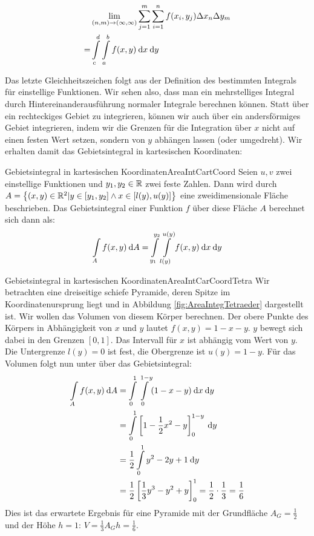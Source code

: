 \begin{center}
    \begin{alignat*}{1}
          & \lim\limits_{(n,m) \to (\infty, \infty)} \sum\limits_{j=1}^m \sum\limits_{i=1}^n f(x_i,y_j) \Delta x_n \Delta y_m  \\
        = & \int\limits_c^d \int\limits_a^b f(x,y) \:\mathrm{d}{x} \:\mathrm{d}{y}
    \end{alignat*}
\end{center}

Das letzte Gleichheitszeichen folgt aus der Definition des bestimmten Integrals für einstellige Funktionen. Wir sehen also, dass man ein mehrstelliges Integral durch Hintereinanderausführung normaler Integrale berechnen können. Statt über ein rechteckiges Gebiet zu integrieren, können wir auch über ein andersförmiges Gebiet integrieren, indem wir die Grenzen für die Integration über $x$ nicht auf einen festen Wert setzen, sondern von $y$ abhängen lassen (oder umgedreht). Wir erhalten damit das Gebietsintegral in kartesischen Koordinaten:

\begin{definition}{Gebietsintegral in kartesischen Koordinaten}{AreaIntCartCoord}
    Seien $u,v$ zwei einstellige Funktionen und $y_1,y_2\in\mathbb{R}$ zwei feste Zahlen. Dann wird durch $A = \left\lbrace (x,y) \in \mathbb{R}^2 | y \in [y_1,y_2] \land x \in [l(y), u(y)] \right\rbrace$ eine zweidimensionale Fläche beschrieben. Das Gebietsintegral einer Funktion $f$ über diese Fläche $A$ berechnet sich dann als:
    $$
        \int\limits_{A} f(x,y) \:\mathrm{d}{A} = \int\limits_{y_1}^{y_2} \int\limits_{l(y)}^{u(y)} f(x,y) \:\mathrm{d}{x} \:\mathrm{d}{y}
    $$
\end{definition}

\begin{example}{Gebietsintegral in kartesischen Koordinaten}{AreaIntCarCoordTetra}
    Wir betrachten eine dreiseitige schiefe Pyramide, deren Spitze im Koordinatenursprung liegt und in Abbildung \ref{fig:AreaIntegTetraeder} dargestellt ist. Wir wollen das Volumen von diesem Körper berechnen. Der obere Punkte des Körpers in Abhängigkeit von $x$ und $y$ lautet $f(x,y) = 1-x-y$. $y$ bewegt sich dabei in den Grenzen $[0,1]$. Das Intervall für $x$ ist abhängig vom Wert von $y$. Die Untergrenze $l(y) = 0$ ist fest, die Obergrenze ist $u(y) = 1 - y$. Für das Volumen folgt nun unter über das Gebietsintegral:
    \begin{alignat*}{1}
        \int\limits_{A} f(x,y) \:\mathrm{d}{A} & = \int\limits_{0}^{1} \int\limits_{0}^{1-y} (1-x-y) \:\mathrm{d}{x} \:\mathrm{d}{y} \\
                                        & = \int\limits_{0}^{1} \left[1-\frac{1}{2}x^2-y\right]_{0}^{1-y} \:\mathrm{d}{y} \\
                                        & = \frac{1}{2} \int\limits_{0}^{1} y^2-2y+1 \:\mathrm{d}{y} \\
                                        & = \frac{1}{2} \left[\frac{1}{3}y^3-y^2+y\right]_0^1 = \frac{1}{2} \cdot \frac{1}{3} = \frac{1}{6}
    \end{alignat*}
    Dies ist das erwartete Ergebnis für eine Pyramide mit der Grundfläche $A_G = \frac{1}{2}$ und der Höhe $h=1$: $V = \frac{1}{3} A_G h = \frac{1}{6}$.
\end{example}

